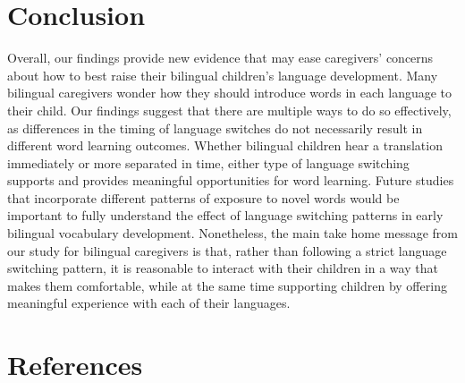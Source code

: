 \documentclass[
  man,floatsintext]{apa7}
\begin{document}
\hypertarget{conclusion}{%
\section{Conclusion}\label{conclusion}}

Overall, our findings provide new evidence that may ease caregivers' concerns about how to best raise their bilingual children's language development. Many bilingual caregivers wonder how they should introduce words in each language to their child. Our findings suggest that there are multiple ways to do so effectively, as differences in the timing of language switches do not necessarily result in different word learning outcomes. Whether bilingual children hear a translation immediately or more separated in time, either type of language switching supports and provides meaningful opportunities for word learning. Future studies that incorporate different patterns of exposure to novel words would be important to fully understand the effect of language switching patterns in early bilingual vocabulary development. Nonetheless, the main take home message from our study for bilingual caregivers is that, rather than following a strict language switching pattern, it is reasonable to interact with their children in a way that makes them comfortable, while at the same time supporting children by offering meaningful experience with each of their languages.

\newpage

\hypertarget{references}{%
\section{References}\label{references}}

\begingroup
\setlength{\parindent}{-0.5in}
\end{document}
